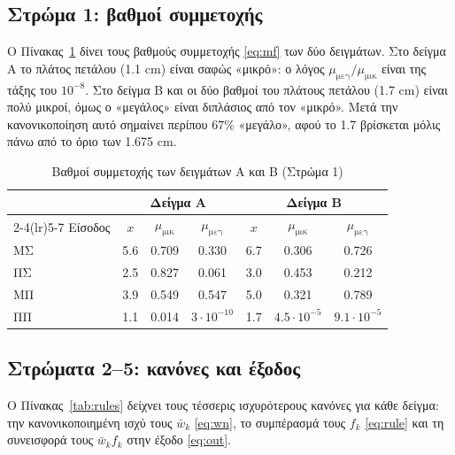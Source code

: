 \documentclass[conference]{IEEEtran}
\begin{document}
\subsection{Στρώμα 1: βαθμοί συμμετοχής}
Ο Πίνακας~\ref{tab:mu} δίνει τους βαθμούς συμμετοχής \eqref{eq:mf} των δύο δειγμάτων.
Στο δείγμα Α το πλάτος πετάλου (1.1 cm) είναι σαφώς «μικρό»: ο λόγος
$\mu_{\text{μεγ}}/\mu_{\text{μικ}}$ είναι της τάξης του $10^{-8}$. Στο δείγμα Β και οι δύο βαθμοί
του πλάτους πετάλου (1.7 cm) είναι πολύ μικροί, όμως ο «μεγάλος» είναι
διπλάσιος από τον «μικρό». Μετά την κανονικοποίηση αυτό σημαίνει περίπου
$67\%$ «μεγάλο», αφού το 1.7 βρίσκεται μόλις πάνω από το όριο των 1.675 cm.

\begin{table}[!t]
\centering
\caption{Βαθμοί συμμετοχής των δειγμάτων Α και Β (Στρώμα 1)}
\label{tab:mu}
\setlength{\tabcolsep}{4pt}
\begin{tabular}{lcccccc}
\toprule
 & \multicolumn{3}{c}{Δείγμα Α} & \multicolumn{3}{c}{Δείγμα Β} \\
\cmidrule(lr){2-4}\cmidrule(lr){5-7}
Είσοδος & $x$ & $\mu_{\text{μικ}}$ & $\mu_{\text{μεγ}}$ & $x$ & $\mu_{\text{μικ}}$ & $\mu_{\text{μεγ}}$ \\
\midrule
ΜΣ & 5.6 & 0.709 & 0.330 & 6.7 & 0.306 & 0.726 \\
ΠΣ & 2.5 & 0.827 & 0.061 & 3.0 & 0.453 & 0.212 \\
ΜΠ & 3.9 & 0.549 & 0.547 & 5.0 & 0.321 & 0.789 \\
ΠΠ & 1.1 & 0.014 & $3{\cdot}10^{-10}$ & 1.7 & $4.5{\cdot}10^{-5}$ & $9.1{\cdot}10^{-5}$ \\
\bottomrule
\end{tabular}
\end{table}

\subsection{Στρώματα 2--5: κανόνες και έξοδος}
Ο Πίνακας~\ref{tab:rules} δείχνει τους τέσσερις ισχυρότερους κανόνες για κάθε
δείγμα: την κανονικοποιημένη ισχύ τους $\bar w_k$ \eqref{eq:wn}, το
συμπέρασμά τους $f_k$ \eqref{eq:rule} και τη συνεισφορά τους $\bar w_k f_k$ στην
έξοδο \eqref{eq:out}.
\end{document}
